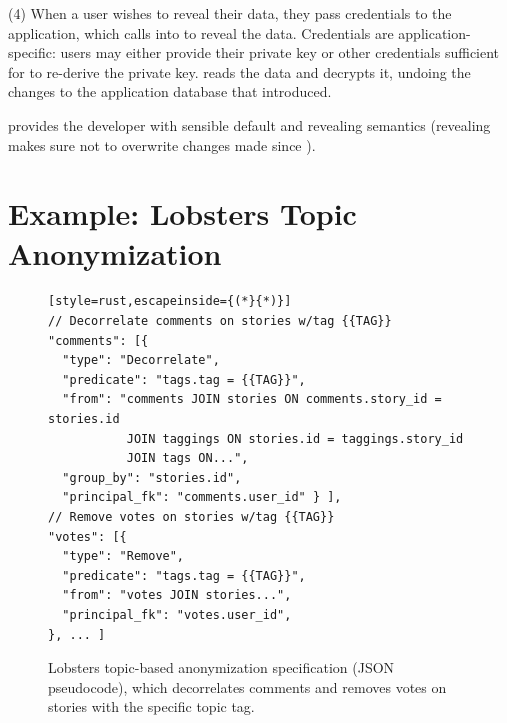%
(4) When a user wishes to reveal their \xxed data, they pass credentials
to the application, which calls into \sys to reveal the data.
%
Credentials are application-specific: users may either provide their private
key or other credentials sufficient for \sys to re-derive the private key.
%
\sys reads the \xxed data and decrypts it, undoing the changes to the
application database that \xxing introduced.
%

%
\sys provides the developer with sensible default \xxing and revealing
semantics (\eg revealing makes sure not to overwrite changes made since
\xxing).


\section{Example: Lobsters Topic Anonymization}
\label{s:design:lobsters}

\begin{figure}[t]
\centering
\begin{lstlisting}[style=rust,escapeinside={(*}{*)}]
// Decorrelate comments on stories w/tag {{TAG}}
"comments": [{
  "type": "Decorrelate",
  "predicate": "tags.tag = {{TAG}}",
  "from": "comments JOIN stories ON comments.story_id = stories.id
           JOIN taggings ON stories.id = taggings.story_id
           JOIN tags ON...",
  "group_by": "stories.id",
  "principal_fk": "comments.user_id" } ],
// Remove votes on stories w/tag {{TAG}}
"votes": [{
  "type": "Remove",
  "predicate": "tags.tag = {{TAG}}",
  "from": "votes JOIN stories...",
  "principal_fk": "votes.user_id",
}, ... ]
\end{lstlisting}
    \caption{Lobsters topic-based anonymization \xx specification (JSON
    pseudocode), which decorrelates comments and removes votes on stories with
    the specific topic tag.}
\label{f:spec}
\end{figure}

